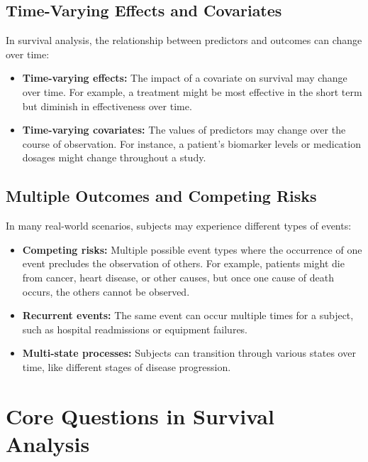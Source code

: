 \subsection{Time-Varying Effects and Covariates}

In survival analysis, the relationship between predictors and outcomes can change over time:

\begin{itemize}
    \item \textbf{Time-varying effects:} The impact of a covariate on survival may change over time. For example, a treatment might be most effective in the short term but diminish in effectiveness over time.
    
    \item \textbf{Time-varying covariates:} The values of predictors may change over the course of observation. For instance, a patient's biomarker levels or medication dosages might change throughout a study.
\end{itemize}

\subsection{Multiple Outcomes and Competing Risks}

In many real-world scenarios, subjects may experience different types of events:

\begin{itemize}
    \item \textbf{Competing risks:} Multiple possible event types where the occurrence of one event precludes the observation of others. For example, patients might die from cancer, heart disease, or other causes, but once one cause of death occurs, the others cannot be observed.
    
    \item \textbf{Recurrent events:} The same event can occur multiple times for a subject, such as hospital readmissions or equipment failures.
    
    \item \textbf{Multi-state processes:} Subjects can transition through various states over time, like different stages of disease progression.
\end{itemize}

\section{Core Questions in Survival Analysis}

